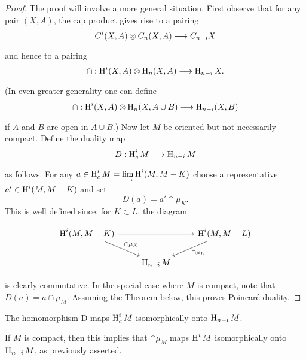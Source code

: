 \documentclass[../main]{subfiles}
\begin{document}
\begin{proof}

The proof will involve a more general situation. First observe that for any pair $(X, A)$, the cap product gives rise to a pairing
\[ C^{i}(X, A) \otimes C_{n}(X, A) \varrightarrow{} C_{n-i} X \]
and hence to a pairing
\[ \cap: \homology^{i}(X, A) \otimes \homology_{n}(X, A) \varrightarrow{} \homology_{n-i} X. \]
(In even greater generality one can define
\[ \cap: \homology^{i}(X, A) \otimes \homology_{n}(X, A \cup B) \varrightarrow{} \homology_{n-i}(X, B) \]
if $A$ and $B$ are open in $A \cup B$.) Now let $M$ be oriented but not necessarily compact. Define the duality map
\[ D: \homology_{c}^{i} M \varrightarrow{} \homology_{n-i} M \]
as follows.  For any $a \in \operatorname{H}_{c}^{i} M = \displaystyle\lim_{\longrightarrow} \operatorname{H}^i(M,M-K)$ choose a representative  $a' \in \operatorname{H}^{i}(M, M-K)$ and set
\[ D(a)=a' \cap \mu_{K}. \]
This is well defined since, for $K \subset L$, the diagram

\[
\begin{tikzcd}
	\homology^i(M,M-K) \arrow[rr] \arrow[rd, "\cap \mu_K"] & & \homology^i(M,M-L) \arrow["\cap\mu_L", ld] \\
	& \homology_{n-i}M
\end{tikzcd}
\]

is clearly commutative. In the special case where $M$ is compact, note that $D(a)=a \cap \mu_{M}$.
Assuming the Theorem below, this proves Poincar\'e duality.
\end{proof}

\begin{theorem}\label{thm:22:9}
The homomorphism D maps $\operatorname{H}_{c}^{i} M$ isomorphically onto $\operatorname{H}_{n-i} M$.
\end{theorem}

If $M$ is compact, then this implies that $\cap \mu_{M}$ maps $\operatorname{H}^{i} M$ isomorphically onto $\operatorname{H}_{n-i} M$, as previously asserted.
\end{document}
